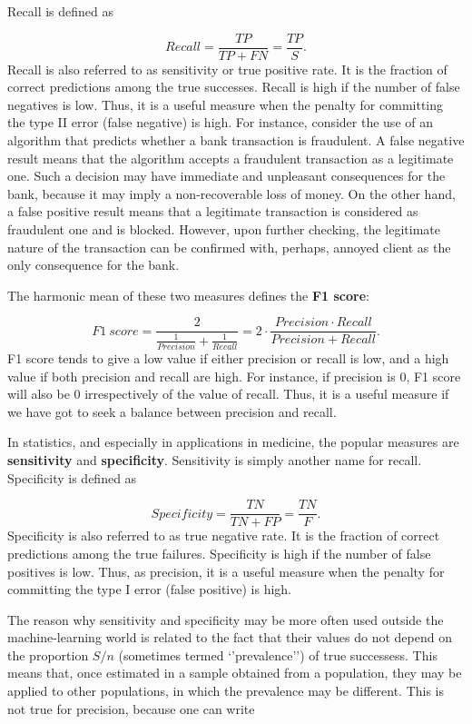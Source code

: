 \documentclass[12pt,]{krantz}
\begin{document}
Recall is defined as

\[
Recall = \frac{TP}{TP+FN} = \frac{TP}{S}.
\]
Recall is also referred to as sensitivity or true positive rate. It is the fraction of correct predictions among the true successes. Recall is high if the number of false negatives is low. Thus, it is a useful measure when the penalty for committing the type II error (false negative) is high. For instance, consider the use of an algorithm that predicts whether a bank transaction is fraudulent. A false negative result means that the algorithm accepts a fraudulent transaction as a legitimate one. Such a decision may have immediate and unpleasant consequences for the bank, because it may imply a non-recoverable loss of money. On the other hand, a false positive result means that a legitimate transaction is considered as fraudulent one and is blocked. However, upon further checking, the legitimate nature of the transaction can be confirmed with, perhaps, annoyed client as the only consequence for the bank.

The harmonic mean of these two measures defines the \textbf{F1 score}:

\[
F1\  score = \frac{2}{\frac{1}{Precision} + \frac{1}{Recall}} = 2\cdot\frac{Precision \cdot Recall}{Precision + Recall}.
\]
F1 score tends to give a low value if either precision or recall is low, and a high value if both precision and recall are high. For instance, if precision is 0, F1 score will also be 0 irrespectively of the value of recall. Thus, it is a useful measure if we have got to seek a balance between precision and recall.

In statistics, and especially in applications in medicine, the popular measures are \textbf{sensitivity} and \textbf{specificity}. Sensitivity is simply another name for recall. Specificity is defined as

\[
Specificity = \frac{TN}{TN + FP} = \frac{TN}{F}.
\]
Specificity is also referred to as true negative rate. It is the fraction of correct predictions among the true failures. Specificity is high if the number of false positives is low. Thus, as precision, it is a useful measure when the penalty for committing the type I error (false positive) is high.

The reason why sensitivity and specificity may be more often used outside the machine-learning world is related to the fact that their values do not depend on the proportion \(S/n\) (sometimes termed `'prevalence'') of true successess. This means that, once estimated in a sample obtained from a population, they may be applied to other populations, in which the prevalence may be different. This is not true for precision, because one can write
\end{document}
